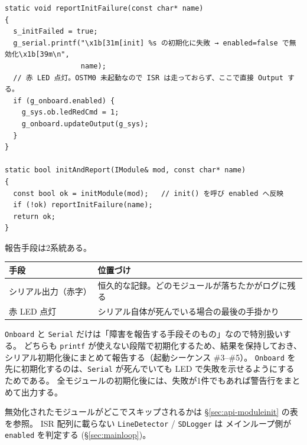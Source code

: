 \documentclass[a4paper,11pt,dvipdfmx]{jsarticle}
\begin{document}
\begin{lstlisting}[caption={初期化の失敗報告 (mcr\_camera\_2026base.cpp)},label=lst:initreport]
static void reportInitFailure(const char* name)
{
  s_initFailed = true;
  g_serial.printf("\x1b[31m[init] %s の初期化に失敗 → enabled=false で無効化\x1b[39m\n",
                  name);
  // 赤 LED 点灯。OSTM0 未起動なので ISR は走っておらず、ここで直接 Output する。
  if (g_onboard.enabled) {
    g_sys.ob.ledRedCmd = 1;
    g_onboard.updateOutput(g_sys);
  }
}

static bool initAndReport(IModule& mod, const char* name)
{
  const bool ok = initModule(mod);   // init() を呼び enabled へ反映
  if (!ok) reportInitFailure(name);
  return ok;
}
\end{lstlisting}

報告手段は2系統ある。

\begin{tabularx}{\textwidth}{l X}
\toprule
\textbf{手段} & \textbf{位置づけ} \\
\midrule
シリアル出力（赤字） & 恒久的な記録。どのモジュールが落ちたかがログに残る \\
赤 LED 点灯           & シリアル自体が死んでいる場合の最後の手掛かり \\
\bottomrule
\end{tabularx}

\vspace{2mm}
\texttt{Onboard} と \texttt{Serial} だけは「障害を報告する手段そのもの」なので特別扱いする。
どちらも \texttt{printf} が使えない段階で初期化するため、結果を保持しておき、
シリアル初期化後にまとめて報告する（起動シーケンス \#3--\#5）。
\texttt{Onboard} を先に初期化するのは、\texttt{Serial} が死んでいても
LED で失敗を示せるようにするためである。
全モジュールの初期化後には、失敗が1件でもあれば警告行をまとめて出力する。

\vspace{2mm}
無効化されたモジュールがどこでスキップされるかは
\hyperref[sec:api-moduleinit]{§\ref*{sec:api-moduleinit}} の表を参照。
ISR 配列に載らない \texttt{LineDetector} / \texttt{SDLogger} は
メインループ側が \texttt{enabled} を判定する
(\hyperref[sec:mainloop]{§\ref*{sec:mainloop}})。
\end{document}
